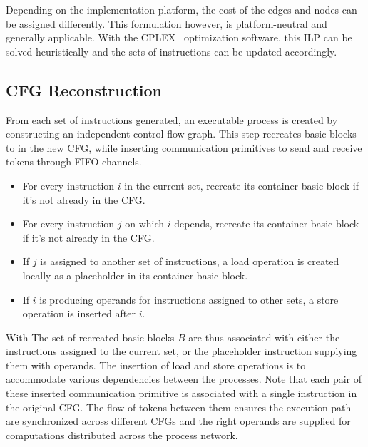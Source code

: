 \documentclass{sig-alternate}
\begin{document}
Depending on the implementation platform, the cost of the edges and nodes can be assigned differently. This formulation however, is platform-neutral and generally applicable.
With the CPLEX~\cite{iILO06a} optimization software, this ILP can be solved heuristically and the sets of instructions can be updated accordingly.


\subsection{CFG Reconstruction}
From each set of instructions generated,
an executable process is created by constructing an independent control flow graph. This step recreates basic blocks to in the new CFG, while inserting communication primitives to send and receive tokens through FIFO channels.
\begin{itemize}
    \item For every instruction $i$  in the current set, recreate
    its container basic block if it's not already in the CFG.
    \item For every instruction $j$ on which $i$ depends, 
    recreate its container basic block if it's not already
    in the CFG.
    \item If $j$ is assigned to another set of instructions, a load operation
    is created locally as a placeholder in its container basic block.
    \item If $i$ is producing operands for instructions assigned to 
    other sets, a store operation is inserted after $i$.
\end{itemize}With 
The set of recreated basic blocks $B$ are thus associated with either the instructions assigned to the current set, or the placeholder instruction supplying them with operands. 
The insertion of load and store operations is to accommodate various
dependencies between the processes. Note that each pair of these inserted communication primitive is associated with a single instruction in the original CFG. The flow of
tokens between them ensures the execution path are synchronized across different CFGs
and the right operands are supplied for computations distributed across the
process network. 
\end{document}
